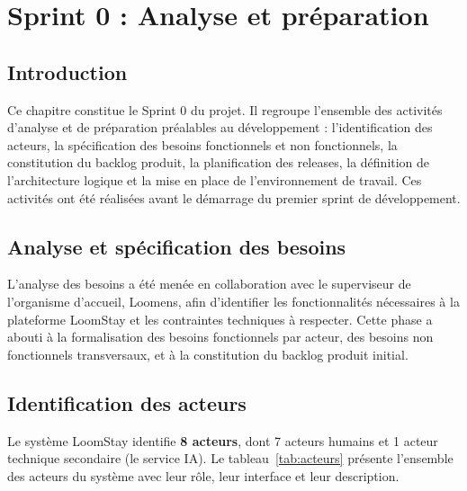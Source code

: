 
\chapter{Sprint 0 : Analyse et préparation}
\label{chap:sprint0}

\section*{Introduction}

Ce chapitre constitue le Sprint 0 du projet. Il regroupe l'ensemble des activités d'analyse et de préparation préalables au développement : l'identification des acteurs, la spécification des besoins fonctionnels et non fonctionnels, la constitution du backlog produit, la planification des releases, la définition de l'architecture logique et la mise en place de l'environnement de travail. Ces activités ont été réalisées avant le démarrage du premier sprint de développement.

\section{Analyse et spécification des besoins}
\label{sec:analyse_besoins}

L'analyse des besoins a été menée en collaboration avec le superviseur de l'organisme d'accueil, Loomens, afin d'identifier les fonctionnalités nécessaires à la plateforme LoomStay et les contraintes techniques à respecter. Cette phase a abouti à la formalisation des besoins fonctionnels par acteur, des besoins non fonctionnels transversaux, et à la constitution du backlog produit initial.

\section{Identification des acteurs}
\label{sec:acteurs}

Le système LoomStay identifie \textbf{8 acteurs}, dont 7 acteurs humains et 1 acteur technique secondaire (le service IA). Le tableau~\ref{tab:acteurs} présente l'ensemble des acteurs du système avec leur rôle, leur interface et leur description.

